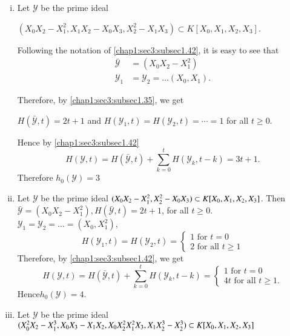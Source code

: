 \setcounter{example}{42}
\begin{example}\label{chap1:sec3:exp1.43}
\begin{enumerate}[(i)]
 \item Let $\mathscr{Y}$ be the prime ideal 

   $(X_0 X_2 -X^2_1, X_1 X_2-X_0 X_3, X^2_2-X_1 X_3) \subset K[X_0,
   X_1, X_2, X_3]$. 

   Following the notation of \ref{chap1:sec3:subsec1.42}, it is easy
   to see that  
   \begin{align*}
     \bar{\mathscr{Y}} &= (X_0 X_2 - X^2_1)\\
     \mathscr{Y}_1 & =\mathscr{Y}_2 = \ldots (X_0,X_1).
   \end{align*}

   Therefore, by \ref{chap1:sec3:subsec1.35}, we get 
   
   $H(\bar{\mathscr{Y}},t) = 2t+1$ and
   $H(\mathscr{Y}_1,t)=H(\mathscr{Y}_2,t)= \cdots = 1$ for all $t \geq
   0$. 
   
   Hence by \ref{chap1:sec3:subsec1.42}
   $$
   H(\mathscr{Y},t)=H(\bar{\mathscr{Y}},t)+ \sum ^t_{k=0}
   H(\mathscr{Y}_k,t-k)= 3t+1. 
   $$
   Therefore $h_0(\mathscr{Y}) = 3$


 \item Let $\mathscr{Y}$ be the prime ideal 
   $(X_0 X_2 -X^2_1, X^2_2-X_0 X_3) \subset K[X_0,
   X_1,\break X_2, X_3]$. Then $\bar{\mathscr{Y}}=(X_0 X_2 -
   X^2_1),H(\bar{\mathscr{Y}},t) = 2t +1$, for all $t \geq
   0$. $\mathscr{Y}_1=\mathscr{Y}_2= \ldots = (X_0,X^2_1)$, 
   \begin{equation*}
     H(\mathscr{Y}_1,t) = H(\mathscr{Y}_2,  t) = 
     \begin{cases}
       1 \text{ for } t = 0 \\
       2 \text{ for all } t \geq 1
     \end{cases}
   \end{equation*}
   Therefore, by \ref{chap1:sec3:subsec1.42}, we get
   \begin{equation*}
     H(\mathscr{Y},t) = H(\bar{\mathscr{Y}},  t) + \sum\limits_{k=0}^t
     H(\mathscr{Y}_k,t-k) =
     \begin{cases}
       1 \text{ for } t = 0 \\
       4t \text{ for all } t \geq 1.
     \end{cases}
   \end{equation*}
   Hence\pageoriginale $h_0 (\mathscr{Y}) = 4$.
 \item Let $\mathscr{Y}$ be the prime ideal 
   $(X^2_0 X_2 -X^3_1, X_0 X_3-X_1 X_2, X_0 X^2_2 X^2_1 X_3,\break X_1 X^3_2
   - X^3_2) \subset K[X_0, X_1,X_2, X_3]$ 
   

\end{enumerate}
\end{example}
